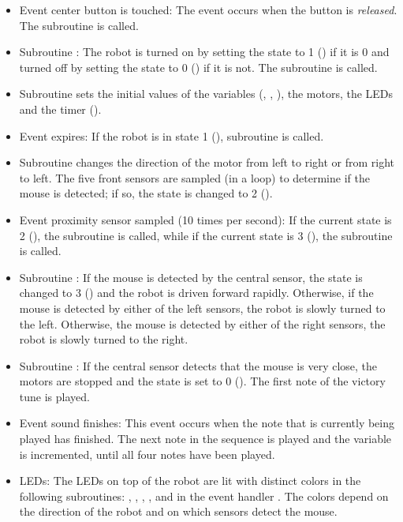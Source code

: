 \begin{itemize}

\item Event center button is touched: The event occurs when the button
is \emph{released}. The subroutine  is called.

\item Subroutine : The robot is turned on by setting the
state to 1 () if it is 0 and turned off by setting the state
to 0 () if it is not. The subroutine  is
called.

\item Subroutine  sets the initial values of the variables
(, , ), the motors, the LEDs and
the timer ().

\item Event  expires: If the robot is in state 1
(), subroutine  is called.

\item Subroutine  changes the direction of the motor from left
to right or from right to left. The five front sensors are
sampled (in a loop) to determine if the mouse is detected; if so, the
state is changed to 2 ().

\item Event proximity sensor sampled (10 times per second): If the
current state is 2 (), the subroutine  is
called, while if the current state is 3 (), the subroutine
 is called.

\item Subroutine : If the mouse is detected by the central
sensor, the state is changed to 3 () and the robot is driven
forward rapidly. Otherwise, if the mouse is detected by either of the
left sensors, the robot is slowly turned to the left. Otherwise, the
mouse is detected by either of the right sensors, the robot is slowly
turned to the right.

\item Subroutine : If the central sensor detects that the
mouse is very close, the motors are stopped and the state is set to 0
(). The first note of the victory tune is played.

\item Event sound finishes: This event occurs when the note that is
currently being played has finished. The next note in the sequence is
played and the variable  is incremented, until all four
notes have been played.

\item LEDs: The LEDs on top of the robot are lit with distinct colors in
the following subroutines: , , ,
, and in the event handler . The colors
depend on the direction of the robot and on which sensors detect the
mouse.

\end{itemize}

